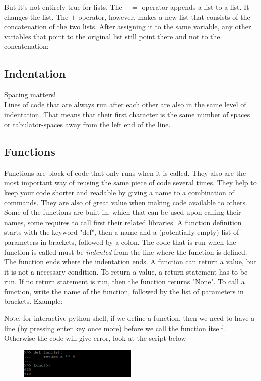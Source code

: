 \documentclass[10pt,a4paper]{article}
\begin{document}
But it's not entirely true for lists.
The $+=$ operator appends a list to a list. It changes the list. The $+$ operator, however, makes a new list that consists of the concatenation of the two lists. After assigning it to the same variable, any other variables that point to the original list still point there and not to the concatenation:



\subsection{Indentation}
\label{subsec:indentation}
Spacing matters!\\
Lines of code that are always run after each other are also in the same level of indentation. That means that their first character is the same number of spaces or tabulator-spaces away from the left end of the line.
\subsection{Functions}
Functions are block of code that only runs when it is called.
They also are the most important way of reusing the same piece of code several times. They help to keep your code shorter and readable by giving a name to a combination of commands.
They are also of great value when making code available to others. Some of the functions are built in, which that can be used upon calling their names, some requires to call first their related libraries. 
A function definition starts with the keyword "def", then a name and a (potentially empty) list of parameters in brackets, followed by a colon. The code that is run when the function is called must be \textit{indented} from the line where the function is defined. The function ends where the indentation ends.
A function can return a value, but it is not a necessary condition. To return a value, a return statement has to be run. If no return statement is run, then the function returns "None".
To call a function, write the name of the function, followed by the list of parameters in brackets.
Example:

Note, for interactive python shell, if we define a function, then we need to have a line (by pressing enter key once more) before we call the function itself. Otherwise the code will give error, look at the script below
\begin{figure}[htbp] \centering
\includegraphics[width=0.5\textwidth]{func.PNG}
\end{figure}
\end{document}
